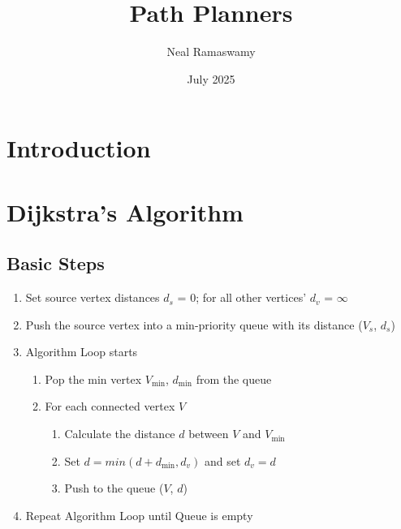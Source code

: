 \documentclass{article}
\title{Path Planners}
\author{Neal Ramaswamy}
\date{July 2025}
\begin{document}
\maketitle
\section{Introduction}
\section{Dijkstra's Algorithm}
\subsection{Basic Steps}
\begin{enumerate}
    \item Set source vertex distances $d_s$ = 0; for all other vertices' $d_v$ = $\infty$
    \item Push the source vertex into a min-priority queue with its distance ($V_s$, $d_s$)
    \item Algorithm Loop starts
        \begin{enumerate}
            \item Pop the min vertex $V_{\text{min}}$, $d_{\text{min}}$ from the queue
            \item For each connected vertex $V$
                \begin{enumerate}
                    \item Calculate the distance $d$ between $V$ and $V_{\text{min}}$
                    \item Set $d = min(d + d_{\text{min}}, d_v)$ and set $d_v = d$
                    \item Push to the queue ($V$, $d$)
                    
                \end{enumerate}
        \end{enumerate}
    \item Repeat Algorithm Loop until Queue is empty
\end{enumerate}
\end{document}
